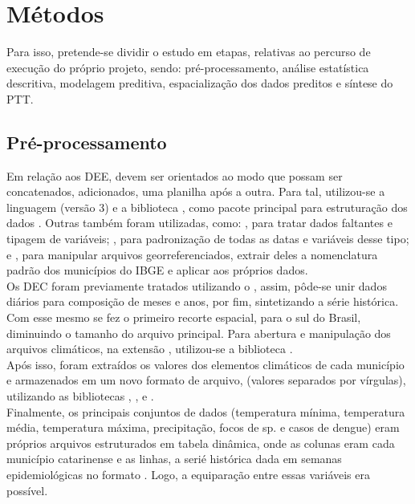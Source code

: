 \section{Métodos}

\indent Para isso, pretende-se dividir o estudo em etapas, relativas ao percurso de execução do próprio projeto, sendo: pré-processamento, análise estatística descritiva, modelagem preditiva, espacialização dos dados preditos e síntese do \acrfull{PTT}.\\


\subsection{Pré-processamento}

Em relação aos \acrshort{DEE}, devem ser orientados ao modo que possam ser concatenados, adicionados, uma planilha após a outra. Para tal, utilizou-se a linguagem  (versão 3) \cite{python3_2009_van}  e a biblioteca  \cite{pandas_2010_scipy, pandas_2020_reback}, como pacote principal para estruturação dos dados . Outras também foram utilizadas, como:  \cite{numpy_2020_harrisarray}, para tratar dados faltantes e tipagem de variáveis;  \cite{python2_1995_van}, para padronização de todas as datas e variáveis desse tipo; e  \cite{geopandas_2020_kelseyjordahl}, para manipular arquivos georreferenciados, extrair deles a nomenclatura padrão dos municípios do \acrshort{IBGE} e aplicar aos próprios dados.\\
\indent Os \acrshort{DEC} foram previamente tratados utilizando o  \cite{CDO_2023_schulzweida}, assim, pôde-se unir dados diários para composição de meses e anos, por fim, sintetizando a série histórica. Com esse mesmo  se fez o primeiro recorte espacial, para o sul do Brasil, diminuindo o tamanho do arquivo principal. Para abertura e manipulação dos arquivos climáticos, na extensão , utilizou-se a biblioteca  \cite{xarray_2016_v0_8_0, xarray_2017_hoyer}.\\
\indent Após isso, foram extraídos os valores dos elementos climáticos de cada município e armazenados em um novo formato de arquivo,  (valores separados por vírgulas), utilizando as bibliotecas , ,  e  \cite{shapely_2007_gillies}.\\
\indent Finalmente,  os principais conjuntos de dados (temperatura mínima, temperatura média, temperatura máxima, precipitação, focos de  sp. e casos de dengue) eram próprios arquivos estruturados em tabela dinâmica, onde as colunas eram cada município catarinense e as linhas, a serié histórica dada em semanas epidemiológicas no formato . Logo, a equiparação entre essas variáveis era possível.


